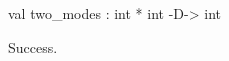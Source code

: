 \chklistingtrue
{}
\begin{ChkListingMsg}
val two_modes : int * int -D-> int
\end{ChkListingMsg}
\begin{ChkListingErr}
Success.
\end{ChkListingErr}
